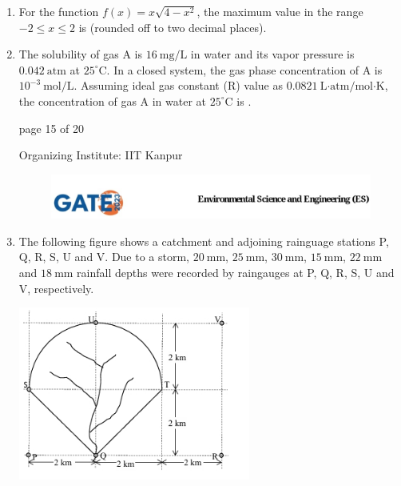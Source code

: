 \documentclass[journal,12pt,onecolumn]{IEEEtran}
\theoremstyle{remark}
\begin{document}
\begin{enumerate}[start=1, label={Q\arabic*.}]
\item For the function $f(x) = x\sqrt{4 - x^2}$, the maximum value in the range $-2 \leq x \leq 2$ is \underline{\hspace{2cm}} (rounded off to two decimal places). \hfill{}

\item The solubility of gas A is $16\ \text{mg/L}$ in water and its vapor pressure is $0.042\ \text{atm}$ at $25^\circ$C. In a closed system, the gas phase concentration of A is $10^{-3}\ \text{mol/L}$. Assuming ideal gas constant (R) value as $0.0821\ \text{L·atm/mol·K}$, the concentration of gas A in water at $25^\circ$C is \underline{\hspace{2cm}} . \hfill{}
\vfill
\begin{center}
{\Large page 15 of 20}
\end{center}
\RaggedRight
{\color{orange}
{\Large Organizing Institute: IIT Kanpur}}
\newpage
\begin{figure}
    
    \includegraphics[width=1\linewidth]{figs/latex.jpg}
    
\end{figure}
\item The following figure  shows a catchment  and adjoining rainguage stations P, Q, R, S, U and V. Due to a storm, $20\ \text{mm}$, $25\ \text{mm}$, $30\ \text{mm}$, $15\ \text{mm}$, $22\ \text{mm}$ and $18\ \text{mm}$ rainfall depths were recorded by raingauges at P, Q, R, S, U and V, respectively.

\begin{center}
\includegraphics[width=0.6\textwidth]{figs/img 4.jpeg}
\end{center}


\end{enumerate}
\end{document}
